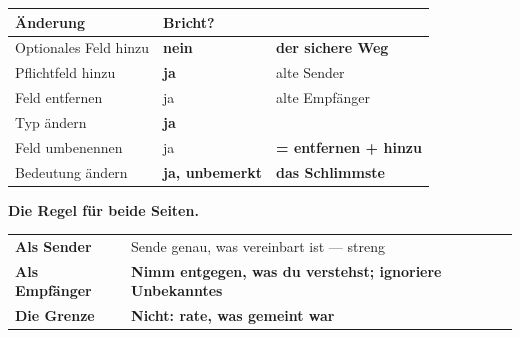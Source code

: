 \begin{merksatz}
\begin{center}
{\small
\renewcommand{\arraystretch}{1.5}
\begin{tabular}{@{}P{3.0cm}P{2.4cm}P{2.6cm}@{}}
\toprule
\textbf{Änderung} & \textbf{Bricht?} & \\
\midrule
Optionales Feld hinzu & \textcolor{gruen}{\textbf{nein}} & \textbf{der sichere Weg}\\
Pflichtfeld hinzu & \textcolor{akzent}{\textbf{ja}} & \textcolor{akzent}{alte Sender}\\
Feld entfernen & \textcolor{akzent}{ja} & \textcolor{akzent}{alte Empfänger}\\
Typ ändern & \textcolor{akzent}{\textbf{ja}} & \\
Feld umbenennen & \textcolor{akzent}{ja} & \textbf{= entfernen + hinzu}\\
Bedeutung ändern & \textcolor{akzent}{\textbf{ja, unbemerkt}} & \textcolor{akzent}{\textbf{das Schlimmste}}\\
\bottomrule
\end{tabular}}
\end{center}

\begin{center}
\begin{minipage}{0.88\textwidth}
\end{minipage}
\end{center}

\textbf{Die Regel für beide Seiten.}

\begin{center}
\renewcommand{\arraystretch}{1.55}
\begin{tabular}{@{}P{2.6cm}P{6.2cm}@{}}
\toprule
\textbf{Als Sender} & Sende genau, was vereinbart ist --- streng\\
\textbf{Als Empfänger} & \textbf{Nimm entgegen, was du verstehst; ignoriere Unbekanntes}\\
\textbf{Die Grenze} & \textbf{Nicht: rate, was gemeint war}\\
\bottomrule
\end{tabular}
\end{center}

\begin{center}
\end{center}


\end{merksatz}
